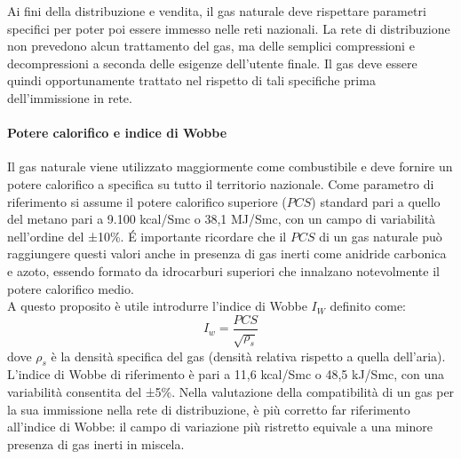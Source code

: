 Ai fini della distribuzione e vendita, il gas naturale deve rispettare parametri specifici per poter poi essere immesso nelle reti nazionali. La rete di distribuzione non prevedono alcun trattamento del gas, ma delle semplici compressioni e decompressioni a seconda delle esigenze dell'utente finale. Il gas deve essere quindi opportunamente trattato nel rispetto di tali specifiche prima dell'immissione in rete.

\paragraph{Potere calorifico e indice di Wobbe}
Il gas naturale viene utilizzato maggiormente come combustibile e deve fornire un potere calorifico a specifica su tutto il territorio nazionale. Come parametro di riferimento si assume il potere calorifico superiore (\(PCS\)) standard pari a quello del metano pari a 9.100 kcal/Smc o 38,1 MJ/Smc, con un campo di variabilità nell'ordine del ±10\%. \'E importante ricordare che il \(PCS\) di un gas naturale può raggiungere questi valori anche in presenza di gas inerti come anidride carbonica e azoto, essendo formato da idrocarburi superiori che innalzano notevolmente il potere calorifico medio.\\
A questo proposito è utile introdurre l'indice di Wobbe \(I_W\) definito come:
\[I_w = \dfrac{PCS}{\sqrt{\rho_s}} \label{eq:wobbe} \]
dove \(\rho_s\) è la densità specifica del gas (densità relativa rispetto a quella dell'aria). L'indice di Wobbe di riferimento è pari a 11,6 kcal/Smc o 48,5 kJ/Smc, con una variabilità consentita del ±5\%. Nella valutazione della compatibilità di un gas per la sua immissione nella rete di distribuzione, è più corretto far riferimento all'indice di Wobbe: il campo di variazione più ristretto equivale a una minore presenza di gas inerti in miscela.

